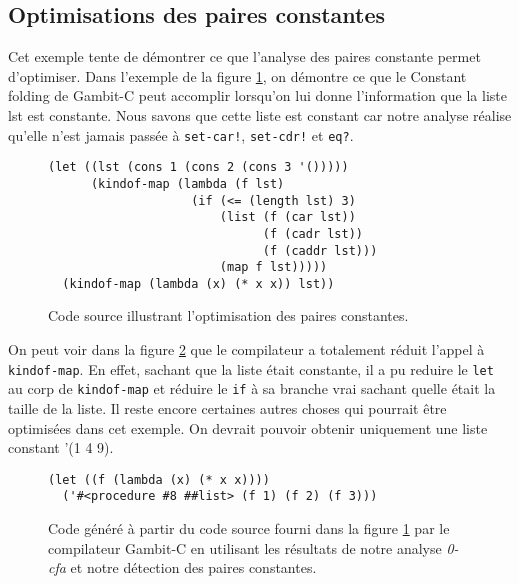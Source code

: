 \clearpage

\subsection{Optimisations des paires constantes}

Cet exemple tente de démontrer ce que l'analyse des paires constante permet
d'optimiser. Dans l'exemple de la figure \ref{cfa-ex2-source}, on démontre
ce que le \og Constant folding \fg de Gambit-C peut accomplir lorsqu'on lui
donne l'information que la liste lst est constante. Nous savons que cette
liste est constant car notre analyse réalise qu'elle n'est jamais passée à
\texttt{set-car!}, \texttt{set-cdr!} et \texttt{eq?}.

\begin{figure}[htbp!]
  \begin{lstlisting}
(let ((lst (cons 1 (cons 2 (cons 3 '()))))
      (kindof-map (lambda (f lst)
                    (if (<= (length lst) 3)
                        (list (f (car lst))
                              (f (cadr lst))
                              (f (caddr lst)))
                        (map f lst)))))
  (kindof-map (lambda (x) (* x x)) lst))
  \end{lstlisting}
  \caption{Code source illustrant l'optimisation des paires constantes.}
  \label{cfa-ex2-source}
\end{figure}

On peut voir dans la figure \ref{cfa-ex2-out} que le compilateur a totalement
réduit l'appel à \texttt{kindof-map}. En effet, sachant que la liste était
constante, il a pu reduire le \texttt{let} au corp de \texttt{kindof-map} et
réduire le \texttt{if} à sa branche vrai sachant quelle était la taille de la liste.
Il reste encore certaines autres choses qui pourrait être optimisées dans cet exemple.
On devrait pouvoir obtenir uniquement une liste constant '(1 4 9).

\begin{figure}[htbp!]
  \begin{lstlisting}
(let ((f (lambda (x) (* x x))))
  ('#<procedure #8 ##list> (f 1) (f 2) (f 3)))
  \end{lstlisting}
  \caption{Code généré à partir du code source fourni dans la figure
    \ref{cfa-ex2-source} par le compilateur Gambit-C en utilisant les
    résultats de notre analyse \textit{0-cfa} et notre détection des
    paires constantes.}
  \label{cfa-ex2-out}
\end{figure}

